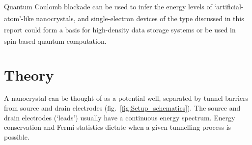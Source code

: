 \documentclass[a4paper,11pt]{article}
\let\oldcite\cite
\renewcommand{\cite}[1]{\textsuperscript{\oldcite{#1}}}
\begin{document}
    Quantum Coulomb blockade can be used to infer the energy levels of `artificial-atom'-like nanocrystals\cite{Banin-1999}, and single-electron devices of the type discussed in this report could form a basis for high-density data storage systems\cite{Likharev-1999} or be used in spin-based quantum computation\cite{Zutic-2004}.


    \section{Theory}

    A nanocrystal can be thought of as a potential well, separated by tunnel barriers from source and drain electrodes (fig.~\ref{fig:Setup_schematics}). The source and drain electrodes (`leads') usually have a continuous energy spectrum. Energy conservation and Fermi statistics dictate when a given tunnelling process is possible.
\end{document}
